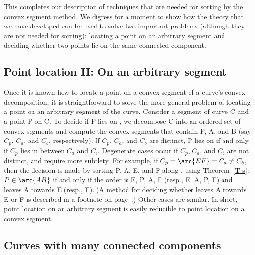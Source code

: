 This completes our description of techniques that are needed for sorting by 
the convex segment method.
We digress for a moment to show how the theory that we have developed can be used
to solve two important problems (although they are not needed for sorting):
locating a point on an arbitrary segment and deciding whether two points lie on the
same connected component.

\subsection{Point location II: On an arbitrary segment}
\label{sec-pII}

Once it is known how to locate a point on a convex segment of a curve's
convex decomposition, it is straightforward to solve the more
general problem of locating a point on an arbitrary segment of the curve.
Consider a segment  of curve C and a point P on C.
To decide if P lies on , we decompose C into an ordered set of convex
segments and compute the convex segments 
that contain P, A, and B (say $C_{p}$, $C_{a}$, and $C_{b}$, respectively).
If $C_{p}$, $C_{a}$, and $C_{b}$ are distinct,
P lies on  if and only if $C_{p}$ lies in between $C_{a}$ and $C_{b}$.
Degenerate cases occur if $C_{p}$, $C_{a}$, and $C_{b}$ are not distinct,
and require more subtlety.
For example, if $C_{p} = \arc{EF} = C_{a} \neq C_{b}$,
then the decision is made by sorting P, A, E, and F along , 
using Theorem~\ref{T-s}:
$P \in \arc{AB}$ if and only if the order is E, P, A, F (resp., E, A, P, F) and
 leaves A towards E (resp., F).
(A method for deciding whether  leaves A towards E or F is described in a footnote 
on page~\pageref{alg-page}.)
Other cases are similar.
In short, point location on an arbitrary segment is easily reducible to point
location on a convex segment.


\subsection{Curves with many connected components}
\label{sec-cc}

